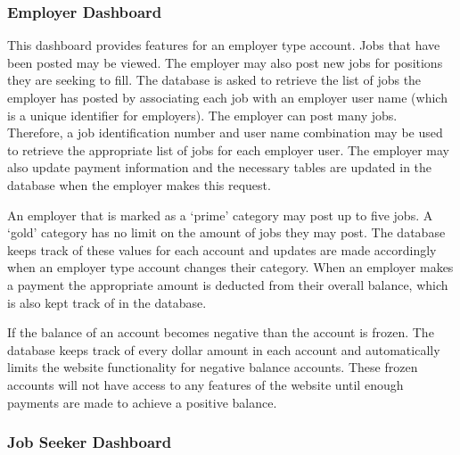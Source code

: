 \documentclass[11pt]{article}
\begin{document}
\subsubsection{Employer Dashboard}

This dashboard provides features for an employer type account. Jobs that have been posted may be viewed. The employer may also post new jobs for positions they are seeking to fill. The database is asked to retrieve the list of jobs the employer has posted by associating each job with an employer user name (which is a unique identifier for employers). The employer can post many jobs. Therefore, a job identification number and user name combination may be used to retrieve the appropriate list of jobs for each employer user. The employer may also update payment information and the necessary tables are updated in the database when the employer makes this request. \par 
	An employer that is marked as a `prime' category may post up to five jobs. A `gold' category has no limit on the amount of jobs they may post. The database keeps track of these values for each account and updates are made accordingly when an employer type account changes their category. When an employer makes a payment the appropriate amount is deducted from their overall balance, which is also kept track of in the database. \par
	If the balance of an account becomes negative than the account is frozen. The database keeps track of every dollar amount in each account and automatically limits the website functionality for negative balance accounts. These frozen accounts will not have access to any features of the website until enough payments are made to achieve a positive balance.	
	
\subsubsection{Job Seeker Dashboard}
\end{document}

